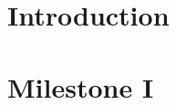 \documentclass{aa}
\begin{document}

   \maketitle
%
\section{Introduction}\label{sec: introduction}

\section{Milestone I}\label{sec: milestone I}

\end{document}
